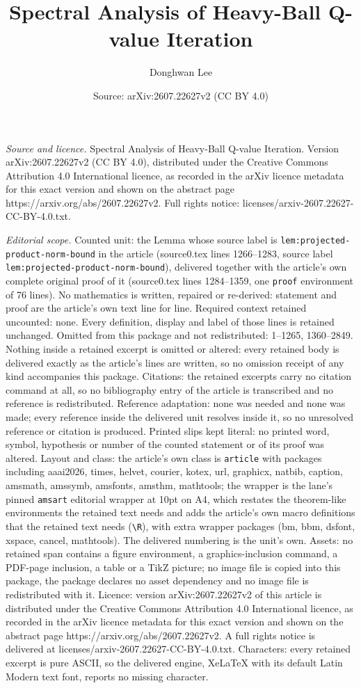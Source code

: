 \documentclass[10pt,a4paper]{amsart}
\title[Spectral Analysis of Heavy-Ball Q-value Iteration]{Spectral Analysis of Heavy-Ball Q-value Iteration}
\author{Donghwan Lee}
\date{Source: arXiv:2607.22627v2 (CC BY 4.0)}
\begin{document}
\maketitle

\noindent\emph{Source and licence.} Spectral Analysis of Heavy-Ball Q-value Iteration. Version arXiv:2607.22627v2 (CC BY 4.0), distributed under the Creative Commons Attribution 4.0 International licence, as recorded in the arXiv licence metadata for this exact version and shown on the abstract page https://arxiv.org/abs/2607.22627v2. Full rights notice: licenses/arxiv-2607.22627-CC-BY-4.0.txt.\par\smallskip

\noindent\textit{Editorial scope.} Counted unit: the Lemma whose source label is \texttt{lem:projected-product-norm-bound} in the article (source0.tex lines 1266--1283, source label \texttt{lem:projected-product-norm-bound}), delivered together with the article's own complete original proof of it (source0.tex lines 1284--1359, one \texttt{proof} environment of 76 lines). No mathematics is written, repaired or re-derived: statement and proof are the article's own text line for line. Required context retained uncounted: none. Every definition, display and label of those lines is retained unchanged. Omitted from this package and not redistributed: 1--1265, 1360--2849. Nothing inside a retained excerpt is omitted or altered: every retained body is delivered exactly as the article's lines are written, so no omission receipt of any kind accompanies this package. Citations: the retained excerpts carry no citation command at all, so no bibliography entry of the article is transcribed and no reference is redistributed. Reference adaptation: none was needed and none was made; every reference inside the delivered unit resolves inside it, so no unresolved reference or citation is produced. Printed slips kept literal: no printed word, symbol, hypothesis or number of the counted statement or of its proof was altered. Layout and class: the article's own class is \texttt{article} with packages including aaai2026, times, helvet, courier, kotex, url, graphicx, natbib, caption, amsmath, amssymb, amsfonts, amsthm, mathtools; the wrapper is the lane's pinned \texttt{amsart} editorial wrapper at 10pt on A4, which restates the theorem-like environments the retained text needs and adds the article's own macro definitions that the retained text needs (\texttt{\textbackslash R}), with extra wrapper packages (bm, bbm, dsfont, xspace, cancel, mathtools). The delivered numbering is the unit's own. Assets: no retained span contains a figure environment, a graphics-inclusion command, a PDF-page inclusion, a table or a TikZ picture; no image file is copied into this package, the package declares no asset dependency and no image file is redistributed with it. Licence: version arXiv:2607.22627v2 of this article is distributed under the Creative Commons Attribution 4.0 International licence, as recorded in the arXiv licence metadata for this exact version and shown on the abstract page https://arxiv.org/abs/2607.22627v2. A full rights notice is delivered at licenses/arxiv-2607.22627-CC-BY-4.0.txt. Characters: every retained excerpt is pure ASCII, so the delivered engine, XeLaTeX with its default Latin Modern text font, reports no missing character.
\end{document}
